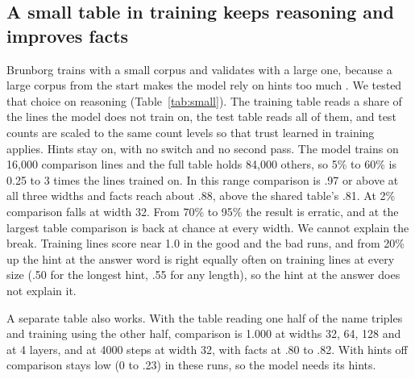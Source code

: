\documentclass[11pt]{article}
\begin{document}
\subsection{A small table in training keeps reasoning and improves facts}
Brunborg trains with a small corpus and validates with a large one, because a large corpus from the start makes the model rely on hints too much \cite{brunborg}. We tested that choice on reasoning (Table~\ref{tab:small}). The training table reads a share of the lines the model does not train on, the test table reads all of them, and test counts are scaled to the same count levels so that trust learned in training applies. Hints stay on, with no switch and no second pass. The model trains on 16,000 comparison lines and the full table holds 84,000 others, so 5\% to 60\% is 0.25 to 3 times the lines trained on. In this range comparison is .97 or above at all three widths and facts reach about .88, above the shared table's .81. At 2\% comparison falls at width 32. From 70\% to 95\% the result is erratic, and at the largest table comparison is back at chance at every width. We cannot explain the break. Training lines score near 1.0 in the good and the bad runs, and from 20\% up the hint at the answer word is right equally often on training lines at every size (.50 for the longest hint, .55 for any length), so the hint at the answer does not explain it.

A separate table also works. With the table reading one half of the name triples and training using the other half, comparison is 1.000 at widths 32, 64, 128 and at 4 layers, and at 4000 steps at width 32, with facts at .80 to .82. With hints off comparison stays low (0 to .23) in these runs, so the model needs its hints.
\end{document}
